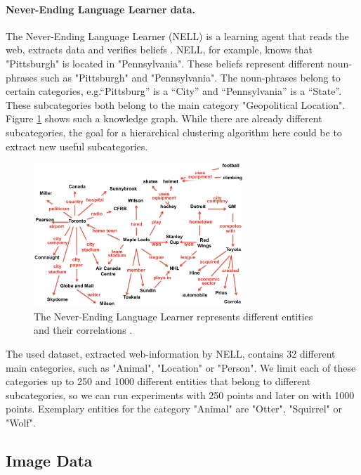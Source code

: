 \paragraph{Never-Ending Language Learner data.} The Never-Ending Language Learner (NELL) is a learning agent that reads the web, extracts data and verifies beliefs \cite{Mitchell:2015:NL:2886521.2886641, Mitchell:2018:NL:3210350.3191513}. NELL, for example, knows that "Pittsburgh" is located in "Pennsylvania". These beliefs represent different noun-phrases such as "Pittsburgh" and "Pennsylvania". The noun-phrases belong to certain categories, e.g.``Pittsburg'' is a ``City'' and ``Pennsylvania'' is a ``State''. These subcategories both belong to the main category "Geopolitical Location". Figure \ref{fig:nell_beliefs} shows such a knowledge graph. While there are already different subcategories, the goal for a hierarchical clustering algorithm here could be to extract new useful subcategories.

\begin{figure}[h]
    \centering
    \includegraphics[width=0.7\textwidth]{images/nell_beliefs}
    \caption{The Never-Ending Language Learner represents different entities and their correlations \cite{Mitchell:2018:NL:3210350.3191513}.}
    \label{fig:nell_beliefs}
\end{figure}

The used dataset, extracted web-information by NELL, contains 32 different main categories, such as "Animal", "Location" or "Person". We limit each of these categories up to 250 and 1000 different entities that belong to different subcategories, so we can run experiments with 250 points and later on with 1000 points. Exemplary entities for the category "Animal" are "Otter", "Squirrel" or "Wolf". 
\newpage
\subsection{Image Data}

